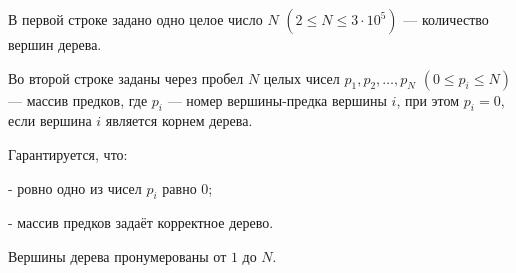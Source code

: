 В первой строке задано одно целое число $N$ $(2 \le N \le 3 \cdot 10^5)$ --- количество вершин дерева.

Во второй строке заданы через пробел $N$ целых чисел $p_1, p_2, \ldots, p_N$ $(0 \le p_i \le N)$ --- массив предков, где $p_i$ --- номер вершины-предка вершины $i$, при этом $p_i = 0$, если вершина $i$ является корнем дерева.

Гарантируется, что:

- ровно одно из чисел $p_i$ равно $0$;

- массив предков задаёт корректное дерево.

Вершины дерева пронумерованы от $1$ до $N$.
